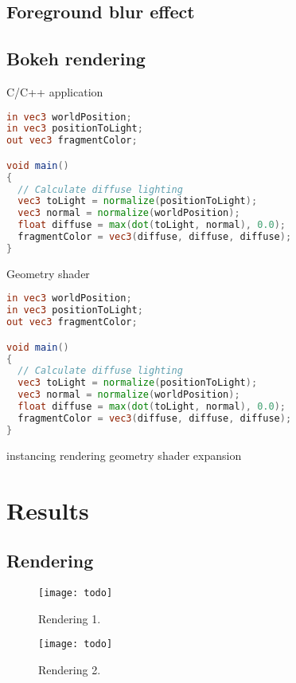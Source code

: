\subsection{Foreground blur effect}

\subsection{Bokeh rendering}

C/C++ application
\begin{lstlisting}[language=GLSL,float={htb},caption={Your caption.},label={YourName:listing1}]
in vec3 worldPosition;
in vec3 positionToLight;
out vec3 fragmentColor;

void main()
{
  // Calculate diffuse lighting
  vec3 toLight = normalize(positionToLight);
  vec3 normal = normalize(worldPosition);
  float diffuse = max(dot(toLight, normal), 0.0);
  fragmentColor = vec3(diffuse, diffuse, diffuse);
}
\end{lstlisting}

Geometry shader
\begin{lstlisting}[language=GLSL,float={htb},caption={Your caption.},label={YourName:listing1}]
in vec3 worldPosition;
in vec3 positionToLight;
out vec3 fragmentColor;

void main()
{
  // Calculate diffuse lighting
  vec3 toLight = normalize(positionToLight);
  vec3 normal = normalize(worldPosition);
  float diffuse = max(dot(toLight, normal), 0.0);
  fragmentColor = vec3(diffuse, diffuse, diffuse);
}
\end{lstlisting}

instancing rendering
geometry shader expansion

\section{Results}

\subsection{Rendering}
	\begin{figure}[htb]\centering
	\texttt{[image: todo]}
	\caption{Rendering 1.}
	\label{YourName:fig1}
	\end{figure}

	\begin{figure}[htb]\centering
	\texttt{[image: todo]}
	\caption{Rendering 2.}
	\label{YourName:fig1}
	\end{figure}

